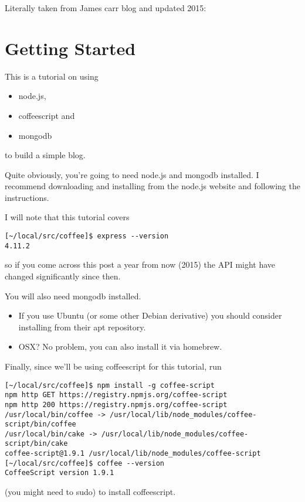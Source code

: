 Literally taken from
James carr blog and updated 2015:


\section{Getting Started}
This is a tutorial on using 
\begin{itemize}
\item
node.js, 
\item
coffeescript and 
\item
mongodb 
\end{itemize}
to build a simple blog. 

Quite obviously, you’re going to need node.js and mongodb installed. I
recommend downloading and installing from the node.js website and
following the instructions. 

I will note that this tutorial covers 
\begin{verbatim}
[~/local/src/coffee]$ express --version
4.11.2
\end{verbatim}
so
if you come across this post a year from now (2015) the API might have changed
significantly since then. 

You will also need mongodb installed.

\begin{itemize}
\item
If you use Ubuntu (or some other Debian derivative)
you should consider installing from their apt repository. 

\item
OSX? No problem,
you can also install it via homebrew.
\end{itemize}


Finally, since we’ll be using coffeescript for this tutorial,
run 
\begin{verbatim}
[~/local/src/coffee]$ npm install -g coffee-script
npm http GET https://registry.npmjs.org/coffee-script
npm http 200 https://registry.npmjs.org/coffee-script
/usr/local/bin/coffee -> /usr/local/lib/node_modules/coffee-script/bin/coffee
/usr/local/bin/cake -> /usr/local/lib/node_modules/coffee-script/bin/cake
coffee-script@1.9.1 /usr/local/lib/node_modules/coffee-script
[~/local/src/coffee]$ coffee --version
CoffeeScript version 1.9.1
\end{verbatim}
(you might need to sudo) to install
coffeescript. 

